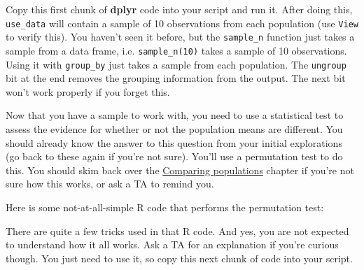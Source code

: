 \documentclass[]{book}
\newenvironment{Shaded}{\begin{snugshade}}{\end{snugshade}}
\newcommand{\KeywordTok}[1]{\textcolor[rgb]{0.13,0.29,0.53}{\textbf{{#1}}}}
\newcommand{\DataTypeTok}[1]{\textcolor[rgb]{0.13,0.29,0.53}{{#1}}}
\newcommand{\DecValTok}[1]{\textcolor[rgb]{0.00,0.00,0.81}{{#1}}}
\newcommand{\StringTok}[1]{\textcolor[rgb]{0.31,0.60,0.02}{{#1}}}
\newcommand{\CommentTok}[1]{\textcolor[rgb]{0.56,0.35,0.01}{\textit{{#1}}}}
\newcommand{\OtherTok}[1]{\textcolor[rgb]{0.56,0.35,0.01}{{#1}}}
\newcommand{\NormalTok}[1]{{#1}}
\begin{document}
Copy this first chunk of \textbf{dplyr} code into your script and run
it. After doing this, \texttt{use\_data} will contain a sample of 10
observations from each population (use \texttt{View} to verify this).
You haven't seen it before, but the \texttt{sample\_n} function just
takes a sample from a data frame, i.e. \texttt{sample\_n(10)} takes a
sample of 10 observations. Using it with \texttt{group\_by} just takes a
sample from each population. The \texttt{ungroup} bit at the end removes
the grouping information from the output. The next bit won't work
properly if you forget this.

Now that you have a sample to work with, you need to use a statistical
test to assess the evidence for whether or not the population means are
different. You should already know the answer to this question from your
initial explorations (go back to these again if you're not sure). You'll
use a permutation test to do this. You should skim back over the
\protect\hyperlink{comparing-populations}{Comparing populations} chapter
if you're not sure how this works, or ask a TA to remind you.

Here is some not-at-all-simple R code that performs the permutation
test:

\begin{Shaded}
\end{Shaded}

There are quite a few tricks used in that R code. And yes, you are not
expected to understand how it all works. Ask a TA for an explanation if
you're curious though. You just need to use it, so copy this next chunk
of code into your script.
\end{document}
